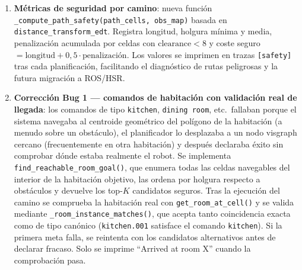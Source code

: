 \begin{enumerate}
  \item \textbf{Métricas de seguridad por camino}: nueva función
        \texttt{\_compute\_path\_safety(path\_cells, obs\_map)} basada en
        \texttt{distance\_transform\_edt}. Registra longitud, holgura mínima y media,
        penalización acumulada por celdas con $\text{clearance} < 8$ y coste seguro
        $= \text{longitud} + 0{,}5 \cdot \text{penalización}$. Los valores se imprimen
        en trazas \texttt{[safety]} tras cada planificación, facilitando el diagnóstico
        de rutas peligrosas y la futura migración a ROS/HSR.

  \item \textbf{Corrección Bug 1 — comandos de habitación con validación real de
        llegada}: los comandos de tipo \texttt{kitchen}, \texttt{dining room},
        etc.\ fallaban porque el sistema navegaba al centroide geométrico del polígono
        de la habitación (a menudo sobre un obstáculo), el planificador lo desplazaba a
        un nodo visgraph cercano (frecuentemente en otra habitación) y después declaraba
        éxito sin comprobar dónde estaba realmente el robot. Se implementa
        \texttt{find\_reachable\_room\_goal()}, que enumera todas las celdas
        navegables del interior de la habitación objetivo, las ordena por holgura
        respecto a obstáculos y devuelve los top-$K$ candidatos seguros. Tras la
        ejecución del camino se comprueba la habitación real con
        \texttt{get\_room\_at\_cell()} y se valida mediante
        \texttt{\_room\_instance\_matches()}, que acepta tanto coincidencia exacta como
        de tipo canónico (\texttt{kitchen.001} satisface el comando \texttt{kitchen}).
        Si la primera meta falla, se reintenta con los candidatos alternativos antes de
        declarar fracaso. Solo se imprime ``Arrived at room X'' cuando la comprobación
        pasa.


\end{enumerate}
